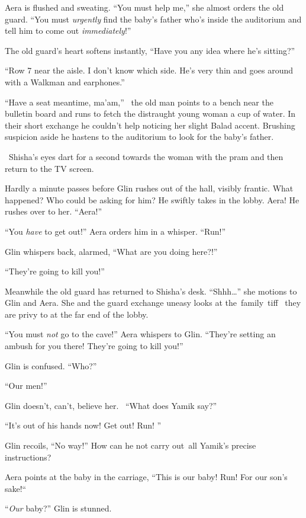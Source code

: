 \documentclass[twoside,11pt]{book}
\begin{document}
Aera is flushed and sweating. ``You must help me,'' she almost orders the old guard.
``You must \textit{urgently} find the baby's father who's inside the auditorium and tell him to come out
\textit{immediately}!''

The old guard's heart softens instantly, ``Have you any idea where he's sitting?''

``Row 7 near the aisle. I don't know which side. He's very thin and goes around with a Walkman and
earphones.''

``Have a seat meantime, ma'am,'' \ the old man points to a bench near the bulletin board and runs to fetch
the distraught young woman a cup of water. In their short exchange he couldn't help noticing her slight Balad accent.
Brushing suspicion aside he hastens to the auditorium to look for the baby's father.

~Shisha's eyes dart for a second towards the woman with{ }the pram and then
return to the TV screen.

Hardly a minute passes before Glin rushes out of the hall, visibly frantic. What happened? Who could be asking for him?
He swiftly takes in the lobby. Aera! He rushes over to her. ``Aera!''

``You \textit{have} to get out!'' Aera orders him in a whisper.
``Run!''

Glin whispers back, alarmed{, }{}``What are you doing here?!''

``They're going to kill you!''

Meanwhile the old guard has returned to Shisha's desk. ``Shhh{\dots}'' she motions to Glin and
Aera. She and the guard exchange {uneasy looks }at the~family~tiff \ they are
privy to at the far end of the lobby.\textbf{ }

``You\textit{ }must\textit{ not} go to the cave!'' Aera whispers to Glin.
``They're setting an ambush for you there! They're going to kill you!''

Glin is confused. ``Who?'' \ ~

``Our men!''

Glin doesn't, can't, believe her. \ ``What does Yamik say?''

``It's out of his hands now! Get out! Run! ''

Glin recoils, ``No way!'' How can he not carry out~all Yamik's precise instructions?

Aera points at the baby in the carriage, ``This is our baby! Run! For our son's sake!``~

``\textit{Our }baby?'' Glin is stunned.
\end{document}
